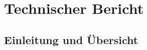 \section{Technischer Bericht}

\subsection{Einleitung und Übersicht}


\newpage


\newpage


\newpage


\newpage


\newpage


\newpage


\newpage


\newpage

